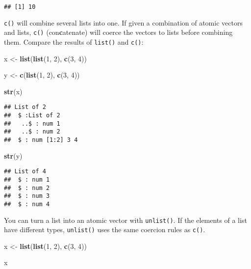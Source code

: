 \documentclass[
]{book}
\newenvironment{Shaded}{\begin{snugshade}}{\end{snugshade}}
\newcommand{\DecValTok}[1]{\textcolor[rgb]{0.00,0.00,0.81}{#1}}
\newcommand{\KeywordTok}[1]{\textcolor[rgb]{0.13,0.29,0.53}{\textbf{#1}}}
\newcommand{\NormalTok}[1]{#1}
\newcommand{\StringTok}[1]{\textcolor[rgb]{0.31,0.60,0.02}{#1}}
\begin{document}
\begin{verbatim}
## [1] 10
\end{verbatim}

\texttt{c()} will combine several lists into one. If given a combination of atomic vectors and lists, \texttt{c()} (con\textbf{c}atenate) will coerce the vectors to lists before combining them. Compare the results of \texttt{list()} and \texttt{c()}:

\begin{Shaded}
\begin{Highlighting}[]
\NormalTok{x \textless{}{-}}\StringTok{ }\KeywordTok{list}\NormalTok{(}\KeywordTok{list}\NormalTok{(}\DecValTok{1}\NormalTok{, }\DecValTok{2}\NormalTok{), }\KeywordTok{c}\NormalTok{(}\DecValTok{3}\NormalTok{, }\DecValTok{4}\NormalTok{))}

\NormalTok{y \textless{}{-}}\StringTok{ }\KeywordTok{c}\NormalTok{(}\KeywordTok{list}\NormalTok{(}\DecValTok{1}\NormalTok{, }\DecValTok{2}\NormalTok{), }\KeywordTok{c}\NormalTok{(}\DecValTok{3}\NormalTok{, }\DecValTok{4}\NormalTok{))}

\KeywordTok{str}\NormalTok{(x)}
\end{Highlighting}
\end{Shaded}

\begin{verbatim}
## List of 2
##  $ :List of 2
##   ..$ : num 1
##   ..$ : num 2
##  $ : num [1:2] 3 4
\end{verbatim}

\begin{Shaded}
\begin{Highlighting}[]
\KeywordTok{str}\NormalTok{(y)}
\end{Highlighting}
\end{Shaded}

\begin{verbatim}
## List of 4
##  $ : num 1
##  $ : num 2
##  $ : num 3
##  $ : num 4
\end{verbatim}

You can turn a list into an atomic vector with \texttt{unlist()}. If the elements of a list have different types, \texttt{unlist()} uses the same coercion rules as \texttt{c()}.

\begin{Shaded}
\begin{Highlighting}[]
\NormalTok{x \textless{}{-}}\StringTok{ }\KeywordTok{list}\NormalTok{(}\KeywordTok{list}\NormalTok{(}\DecValTok{1}\NormalTok{, }\DecValTok{2}\NormalTok{), }\KeywordTok{c}\NormalTok{(}\DecValTok{3}\NormalTok{, }\DecValTok{4}\NormalTok{))}

\NormalTok{x}
\end{Highlighting}
\end{Shaded}
\end{document}
